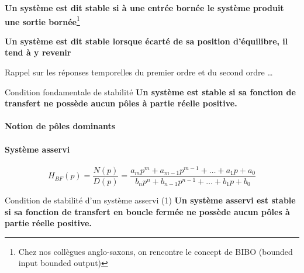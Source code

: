 \textbf{Un système est dit stable si à une entrée bornée le système produit 
une sortie bornée}\footnote{Chez nos collègues anglo-saxons, on rencontre le 
concept de BIBO (\og bounded input bounded output\fg)}

\textbf{Un système est dit stable lorsque écarté de sa position d'équilibre, il 
tend à y revenir}

Rappel sur les réponses temporelles du premier ordre et du second ordre \ldots
\acpl

\begin{criteria}{Condition fondamentale de stabilité}
    \textbf{Un système est stable si sa fonction de transfert ne possède aucun 
            pôles à partie réelle positive.}
\end{criteria}



\paragraph{Notion de pôles dominants}

\paragraph{Système asservi}

\begin{center}
\end{center}

$$
H_{BF}(p)=\dfrac{N(p)}{D(p)}=\dfrac{a_mp^m+a_{m-1}p^{m-1}+\ldots+a_1p+a_0}
                                   {b_np^n+b_{n-1}p^{n-1}+\ldots+b_1p+b_0}
$$

\begin{criteria}{Condition de stabilité d'un système asservi (1)}
    \textbf{Un système asservi est stable si sa fonction de transfert en 
            boucle fermée ne possède aucun pôles à partie réelle positive.}
\end{criteria}


